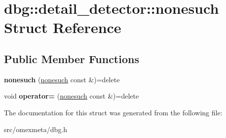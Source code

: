\hypertarget{structdbg_1_1detail__detector_1_1nonesuch}{}\section{dbg\+:\+:detail\+\_\+detector\+:\+:nonesuch Struct Reference}
\label{structdbg_1_1detail__detector_1_1nonesuch}
\subsection*{Public Member Functions}
\begin{DoxyCompactItemize}
\item 
\mbox{\label{structdbg_1_1detail__detector_1_1nonesuch_a82c9bfc90b56b542819d8df5af7cebe6}} 
{\bfseries nonesuch} (\hyperlink{structdbg_1_1detail__detector_1_1nonesuch}{nonesuch} const \&)=delete
\item 
\mbox{\label{structdbg_1_1detail__detector_1_1nonesuch_af0d1b2ab32ace678e2c9d95684d1917b}} 
void {\bfseries operator=} (\hyperlink{structdbg_1_1detail__detector_1_1nonesuch}{nonesuch} const \&)=delete
\end{DoxyCompactItemize}


The documentation for this struct was generated from the following file\+:\begin{DoxyCompactItemize}
\item 
src/omexmeta/dbg.\+h\end{DoxyCompactItemize}
